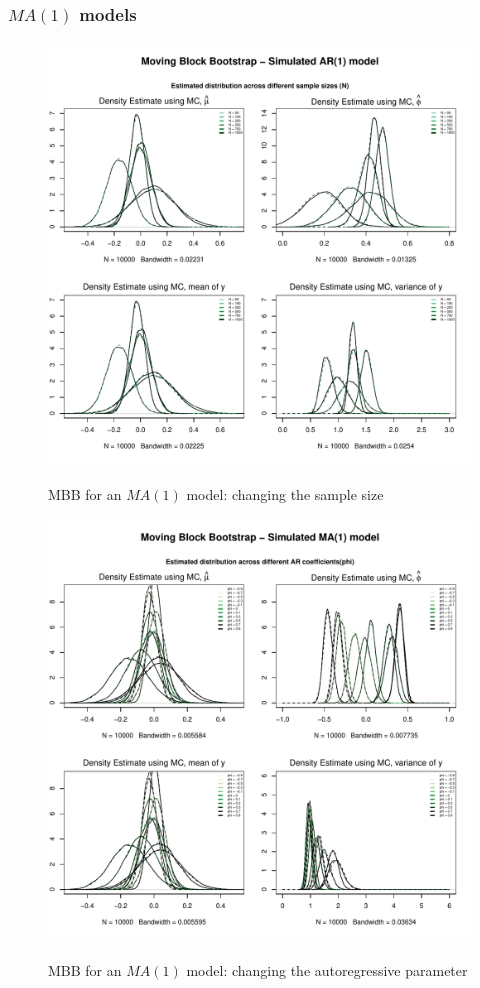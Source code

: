 \documentclass{article}
\begin{document}
\clearpage
\subsubsection{$MA(1)$ models}
\begin{figure}[hbt!]
\includegraphics[width=\textwidth]{plots/MBB_AR1_densities_diff_smpl}
\label{fig:MBB_MA1_densities_diff_smpl}
\caption{MBB for an $MA(1)$ model: changing the sample size}
\centering
\end{figure}

\begin{figure}[hbt!]
\includegraphics[width=\textwidth]{plots/MBB_MA1_densities_diff_ARq}
\label{fig:MBB_MA1_densities_diff_ARq}
\caption{MBB for an $MA(1)$ model: changing the autoregressive parameter}
\centering
\end{figure}
\end{document}
